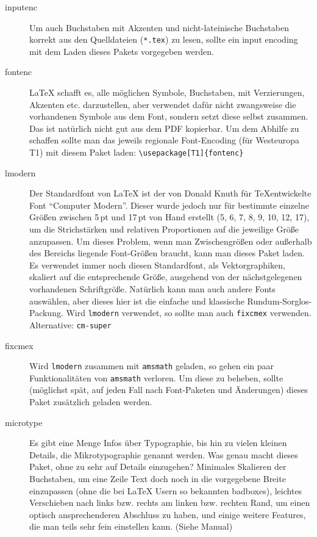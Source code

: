 \documentclass[11pt,
               a4paper,
               parskip=half,
               ]{scrartcl}
\newcommand{\textsw}[1]{\texttt{#1}} %
\newcommand{\file}[1]{\texttt{#1}} %
\begin{document}
\begin{description}
  \item[inputenc] Um auch Buchstaben mit Akzenten
    und nicht-lateinische Buchstaben
    korrekt aus den Quelldateien (\file{*.tex}) zu lesen,
    sollte ein input encoding mit dem Laden
    dieses Pakets vorgegeben werden.

  \item[fontenc] \LaTeX{} schafft es, alle möglichen Symbole,
    Buchstaben, mit Verzierungen, Akzenten etc. darzustellen,
    aber verwendet dafür nicht zwangsweise die vorhandenen Symbole
    aus dem Font, sondern setzt diese selbst zusammen.
    Das ist natürlich nicht gut aus dem PDF kopierbar.
    Um dem Abhilfe zu schaffen sollte man
    das jeweils regionale Font-Encoding (für Westeuropa T1)
    mit diesem Paket laden: \verb+\usepackage[T1]{fontenc}+

  \item[lmodern] Der Standardfont von \LaTeX
    ist der von Donald Knuth für \TeX entwickelte
    Font \enquote{Computer Modern}.
    Dieser wurde jedoch nur für bestimmte einzelne Größen
    zwischen 5\,pt und 17\,pt von Hand erstellt (5, 6, 7, 8, 9, 10, 12, 17),
    um die Strichstärken und relativen Proportionen
    auf die jeweilige Größe anzupassen.
    Um dieses Problem, wenn man Zwischengrößen
    oder außerhalb des Bereichs liegende Font-Größen braucht,
    kann man dieses Paket laden.
    Es verwendet immer noch diesen Standardfont, als Vektorgraphiken,
    skaliert auf die entsprechende Größe,
    ausgehend von der nächstgelegenen vorhandenen Schriftgröße.
    Natürlich kann man auch andere Fonts auswählen,
    aber dieses hier ist die einfache und klassische
    Rundum-Sorglos-Packung. Wird \textsw{lmodern} verwendet,
    so sollte man auch \textsw{fixcmex} verwenden.
    Alternative: \textsw{cm-super}

  \item[fixcmex] Wird \textsw{lmodern} zusammen mit
    \textsw{amsmath} geladen,
    so gehen ein paar Funktionalitäten von \textsw{amsmath} verloren.
    Um diese zu beheben, sollte
    (möglichst spät, auf jeden Fall nach Font-Paketen und Änderungen)
    dieses Paket zusätzlich geladen werden.

  \item[microtype] Es gibt eine Menge Infos über Typographie,
    bis hin zu vielen kleinen Details, die Mikrotypographie genannt werden.
    Was genau macht dieses Paket, ohne zu sehr auf Details einzugehen?
    Minimales Skalieren der Buchstaben, um eine Zeile Text
    doch noch in die vorgegebene Breite einzupassen
    (ohne die bei \LaTeX{} Usern so bekannten badboxes),
    leichtes Verschieben nach links bzw. rechts am linken bzw. rechten Rand,
    um einen optisch ansprechenderen Abschluss zu haben,
    und einige weitere Features,
    die man teils sehr fein einstellen kann. (Siehe Manual)


\end{description}
\end{document}
